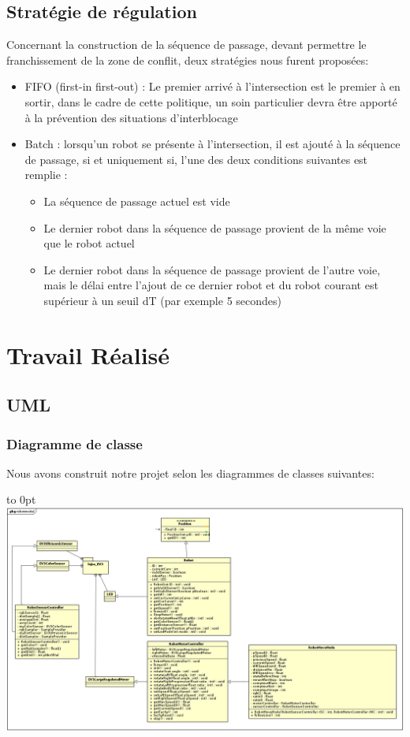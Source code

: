 \documentclass[french,a4paper,12pt]{report}
\begin{document}
\chapter{Stratégie de régulation}
Concernant la construction de la séquence de passage, devant permettre le franchissement de la zone de conflit, deux stratégies nous furent proposées:

\begin{itemize}
\item FIFO (first-in first-out) : 
	Le premier arrivé à l’intersection est le premier à en sortir, dans le cadre de cette
	politique, un soin particulier devra être apporté à la prévention des situations d’interblocage
	
\item Batch : lorsqu’un robot se présente à l’intersection, il est ajouté à la séquence de passage, si et
	uniquement si, l’une des deux conditions suivantes est remplie :
	\begin{itemize}
	\item La séquence de passage actuel est vide
	\item Le dernier robot dans la séquence de passage provient de la même voie que le robot actuel
	\item Le dernier robot dans la séquence de passage provient de l’autre voie, mais le délai entre l’ajout
		de ce dernier robot et du robot courant est supérieur à un seuil dT (par exemple 5 secondes)
	\end{itemize}
\end{itemize}


\part{Travail Réalisé}

\chapter{UML}

\section{Diagramme de classe}
Nous avons construit notre projet selon les diagrammes de classes suivantes:\newline

\hfill\hbox to 0pt{\hss\includegraphics[width=20cm]{robotmodel.png}\hss}\hfill\null\newline
\end{document}
